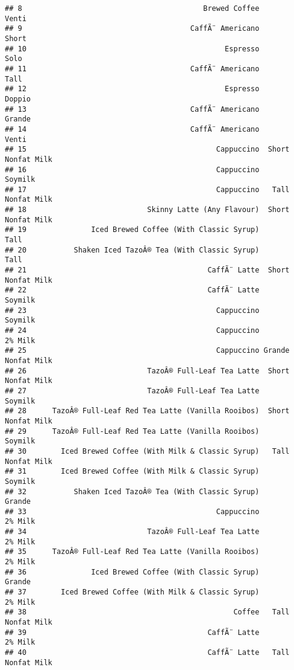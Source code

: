 \documentclass[
]{article}
\begin{document}
\begin{verbatim}
## 8                                          Brewed Coffee              Venti
## 9                                       CaffÃ¨ Americano              Short
## 10                                              Espresso               Solo
## 11                                      CaffÃ¨ Americano               Tall
## 12                                              Espresso             Doppio
## 13                                      CaffÃ¨ Americano             Grande
## 14                                      CaffÃ¨ Americano              Venti
## 15                                            Cappuccino  Short Nonfat Milk
## 16                                            Cappuccino            Soymilk
## 17                                            Cappuccino   Tall Nonfat Milk
## 18                            Skinny Latte (Any Flavour)  Short Nonfat Milk
## 19               Iced Brewed Coffee (With Classic Syrup)               Tall
## 20           Shaken Iced TazoÂ® Tea (With Classic Syrup)               Tall
## 21                                          CaffÃ¨ Latte  Short Nonfat Milk
## 22                                          CaffÃ¨ Latte            Soymilk
## 23                                            Cappuccino            Soymilk
## 24                                            Cappuccino            2% Milk
## 25                                            Cappuccino Grande Nonfat Milk
## 26                            TazoÂ® Full-Leaf Tea Latte  Short Nonfat Milk
## 27                            TazoÂ® Full-Leaf Tea Latte            Soymilk
## 28      TazoÂ® Full-Leaf Red Tea Latte (Vanilla Rooibos)  Short Nonfat Milk
## 29      TazoÂ® Full-Leaf Red Tea Latte (Vanilla Rooibos)            Soymilk
## 30        Iced Brewed Coffee (With Milk & Classic Syrup)   Tall Nonfat Milk
## 31        Iced Brewed Coffee (With Milk & Classic Syrup)            Soymilk
## 32           Shaken Iced TazoÂ® Tea (With Classic Syrup)             Grande
## 33                                            Cappuccino            2% Milk
## 34                            TazoÂ® Full-Leaf Tea Latte            2% Milk
## 35      TazoÂ® Full-Leaf Red Tea Latte (Vanilla Rooibos)            2% Milk
## 36               Iced Brewed Coffee (With Classic Syrup)             Grande
## 37        Iced Brewed Coffee (With Milk & Classic Syrup)            2% Milk
## 38                                                Coffee   Tall Nonfat Milk
## 39                                          CaffÃ¨ Latte            2% Milk
## 40                                          CaffÃ¨ Latte   Tall Nonfat Milk

\end{verbatim}
\end{document}
